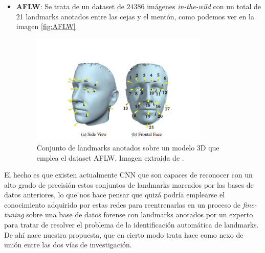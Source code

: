 \begin{itemize}
                \item \textbf{AFLW}: Se trata de un dataset de $24386$ imágenes \textit{in-the-wild} con un total de 21 landmarks anotados entre las cejas y el mentón, como podemos ver en la imagen \autoref{fig:AFLW}  \cite{AFLW}
                \begin{figure}[!h]
                    \centering
                    \includegraphics[width=0.8\textwidth]{img/AFLW.png}
                    \caption{Conjunto de landmarks anotados sobre un modelo $3$D que emplea el dataset AFLW. Imagen extraida de \cite{AFLW}.}
                    \label{fig:AFLW}
                \end{figure}
            \end{itemize}
            
            \medskip
            
            \noindent El hecho es que existen actualmente CNN que son capaces de reconocer con un alto grado de precisión estos conjuntos de landmarks marcados por las bases de datos anteriores, lo que nos hace pensar que quizá podría emplearse el conocimiento adquirido por estas redes para reentrenarlas en un proceso de \textit{fine-tuning} sobre una base de datos forense con landmarks anotados por un experto para tratar de resolver el problema de la identificación automática de landmarks. De ahí nace nuestra propuesta, que en cierto modo trata hace como nexo de unión entre las dos vías de investigación.    
\endinput


